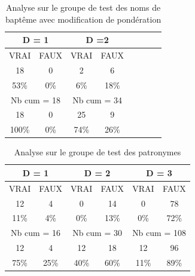 \renewcommand{\arraystretch} {1.25}
\begin{table}[ht]
    \centering
    \begin{tabular}{|c|c|c|c|c|c|c|c|}
        \hline \multicolumn{2}{|c}{D = 1}& \multicolumn{2}{|c|}{D =2 }\\
        \hline VRAI & FAUX & VRAI & FAUX \\
        \hline \hline  18 & 0 & 2 & 6 \\
        \hline 53\% & 0\% & 6\% & 18\% \\
        \hline \hline \multicolumn{2}{|c}{Nb cum = 18}& \multicolumn{2}{|c|}{Nb cum = 34}\\
        \hline \hline  18 & 0 & 25 & 9 \\
        \hline 100\% & 0\% & 74\% & 26\% \\
        \hline 
    \end{tabular}
    \caption{Analyse sur le groupe de test des noms de baptême avec modification de pondération}
    \label{groupe_prenom_md}
\end{table}
\vspace{1cm}

\renewcommand{\arraystretch} {1.25}
\begin{table}[ht]
    \centering
    \begin{tabular}{|c|c|c|c|c|c|}
        \hline \multicolumn{2}{|c}{D = 1}& \multicolumn{2}{|c}{D = 2} & \multicolumn{2}{|c|}{D = 3 } \\
        \hline VRAI & FAUX & VRAI & FAUX & VRAI & FAUX \\
        \hline \hline  12 & 4 & 0 & 14 & 0 & 78 \\
        \hline 11\% & 4\% & 0\% & 13\% & 0\% & 72\% \\
        \hline \hline \multicolumn{2}{|c}{Nb cum = 16}& \multicolumn{2}{|c|}{Nb cum = 30} & \multicolumn{2}{c|}{Nb cum = 108} \\
        \hline \hline  12 & 4 & 12 & 18 & 12 & 96 \\
        \hline 75\% & 25\% & 40\% & 60\% & 11\% & 89\% \\
        \hline 
    \end{tabular}
    \caption{Analyse sur le groupe de test des patronymes }
    \label{groupe_patro}
\end{table}

